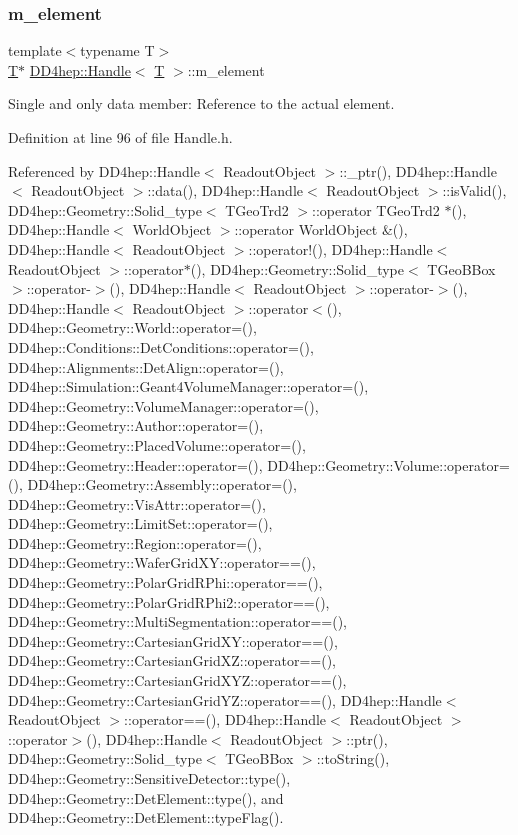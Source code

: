 \subsubsection{\texorpdfstring{m\+\_\+element}{m\_element}}
{\footnotesize\ttfamily template$<$typename T$>$ \\
\hyperlink{class_t}{T}$\ast$ \hyperlink{class_d_d4hep_1_1_handle}{D\+D4hep\+::\+Handle}$<$ \hyperlink{class_t}{T} $>$\+::m\+\_\+element}



Single and only data member\+: Reference to the actual element. 



Definition at line 96 of file Handle.\+h.



Referenced by D\+D4hep\+::\+Handle$<$ Readout\+Object $>$\+::\+\_\+ptr(), D\+D4hep\+::\+Handle$<$ Readout\+Object $>$\+::data(), D\+D4hep\+::\+Handle$<$ Readout\+Object $>$\+::is\+Valid(), D\+D4hep\+::\+Geometry\+::\+Solid\+\_\+type$<$ T\+Geo\+Trd2 $>$\+::operator T\+Geo\+Trd2 $\ast$(), D\+D4hep\+::\+Handle$<$ World\+Object $>$\+::operator World\+Object \&(), D\+D4hep\+::\+Handle$<$ Readout\+Object $>$\+::operator!(), D\+D4hep\+::\+Handle$<$ Readout\+Object $>$\+::operator$\ast$(), D\+D4hep\+::\+Geometry\+::\+Solid\+\_\+type$<$ T\+Geo\+B\+Box $>$\+::operator-\/$>$(), D\+D4hep\+::\+Handle$<$ Readout\+Object $>$\+::operator-\/$>$(), D\+D4hep\+::\+Handle$<$ Readout\+Object $>$\+::operator$<$(), D\+D4hep\+::\+Geometry\+::\+World\+::operator=(), D\+D4hep\+::\+Conditions\+::\+Det\+Conditions\+::operator=(), D\+D4hep\+::\+Alignments\+::\+Det\+Align\+::operator=(), D\+D4hep\+::\+Simulation\+::\+Geant4\+Volume\+Manager\+::operator=(), D\+D4hep\+::\+Geometry\+::\+Volume\+Manager\+::operator=(), D\+D4hep\+::\+Geometry\+::\+Author\+::operator=(), D\+D4hep\+::\+Geometry\+::\+Placed\+Volume\+::operator=(), D\+D4hep\+::\+Geometry\+::\+Header\+::operator=(), D\+D4hep\+::\+Geometry\+::\+Volume\+::operator=(), D\+D4hep\+::\+Geometry\+::\+Assembly\+::operator=(), D\+D4hep\+::\+Geometry\+::\+Vis\+Attr\+::operator=(), D\+D4hep\+::\+Geometry\+::\+Limit\+Set\+::operator=(), D\+D4hep\+::\+Geometry\+::\+Region\+::operator=(), D\+D4hep\+::\+Geometry\+::\+Wafer\+Grid\+X\+Y\+::operator==(), D\+D4hep\+::\+Geometry\+::\+Polar\+Grid\+R\+Phi\+::operator==(), D\+D4hep\+::\+Geometry\+::\+Polar\+Grid\+R\+Phi2\+::operator==(), D\+D4hep\+::\+Geometry\+::\+Multi\+Segmentation\+::operator==(), D\+D4hep\+::\+Geometry\+::\+Cartesian\+Grid\+X\+Y\+::operator==(), D\+D4hep\+::\+Geometry\+::\+Cartesian\+Grid\+X\+Z\+::operator==(), D\+D4hep\+::\+Geometry\+::\+Cartesian\+Grid\+X\+Y\+Z\+::operator==(), D\+D4hep\+::\+Geometry\+::\+Cartesian\+Grid\+Y\+Z\+::operator==(), D\+D4hep\+::\+Handle$<$ Readout\+Object $>$\+::operator==(), D\+D4hep\+::\+Handle$<$ Readout\+Object $>$\+::operator$>$(), D\+D4hep\+::\+Handle$<$ Readout\+Object $>$\+::ptr(), D\+D4hep\+::\+Geometry\+::\+Solid\+\_\+type$<$ T\+Geo\+B\+Box $>$\+::to\+String(), D\+D4hep\+::\+Geometry\+::\+Sensitive\+Detector\+::type(), D\+D4hep\+::\+Geometry\+::\+Det\+Element\+::type(), and D\+D4hep\+::\+Geometry\+::\+Det\+Element\+::type\+Flag().



